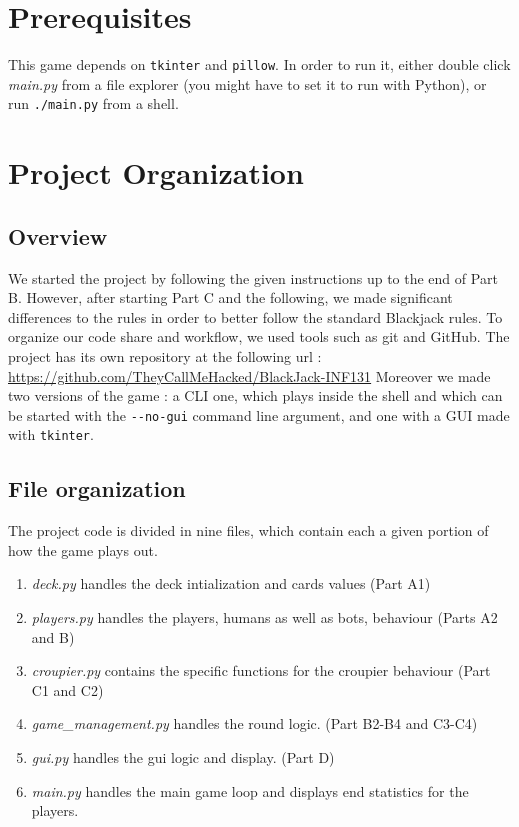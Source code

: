 \documentclass[a4paper, twoside]{report}
\begin{document}
\chapter*{Prerequisites}

    This game depends on \texttt{tkinter} and \texttt{pillow}.
    In order to run it, either double click \textit{main.py} from a file explorer (you might have to set it to run with Python), or run
    \texttt{./main.py} from a shell.
    

\clearpage

\setcounter{page}{1}

\chapter{Project Organization}

    \section{Overview}
        \par
        We started the project by following the given instructions up to the end of Part B. 
        However, after starting Part C and the following, we made significant differences to the rules in order to better 
        follow the standard Blackjack rules.
        To organize our code share and workflow, we used tools such as git and GitHub.\linebreak
        The project has its own repository at the following url : \linebreak
        \url{https://github.com/TheyCallMeHacked/BlackJack-INF131}
        \linebreak
        Moreover we made two versions of the game : a CLI one, which plays inside the shell and which can be started with the \texttt{-{}-no-gui} command line argument, and one with a GUI made with \texttt{tkinter}.
    \section{File organization}
        \par
        The project code is divided in nine files, which contain each a given portion of how the game plays out. 
        \begin{enumerate}
            \item \textit{deck.py} handles the deck intialization and cards values (Part A1)
            \item \textit{players.py} handles the players, humans as well as bots, behaviour (Parts A2 and B)
            \item \textit{croupier.py} contains the specific functions for the croupier behaviour (Part C1 and C2)
            \item \textit{game\_management.py} handles the round logic. (Part B2-B4 and C3-C4) 
            \item \textit{gui.py} handles the gui logic and display. (Part D)
            \item \textit{main.py} handles the main game loop and displays end statistics for the players.
        \end{enumerate}
\end{document}
